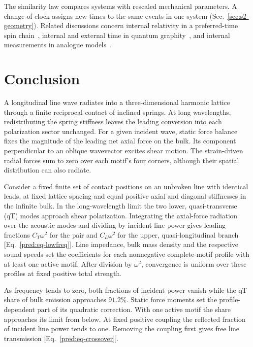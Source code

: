 \documentclass[10pt,aps,onecolumn,floatfix,notitlepage,nofootinbib,showkeys]{revtex4-2}
\begin{document}
The similarity law compares systems with rescaled mechanical parameters. A change of clock assigns new times to the same events in one system (Sec.~\ref{sec:s2-geometry}). Related discussions concern internal relativity in a preferred-time spin chain~\cite{Dreyer2007}, internal and external time in quantum graphity~\cite{Konopka2008}, and internal measurements in analogue models~\cite{Todd2021,BilsonThompson2023}.

\section{Conclusion}
\label{sec:conclusion}

A longitudinal line wave radiates into a three-dimensional harmonic lattice through a finite reciprocal contact of inclined springs. At long wavelengths, redistributing the spring stiffness leaves the leading conversion into each polarization sector unchanged. For a given incident wave, static force balance fixes the magnitude of the leading net axial force on the bulk. Its component perpendicular to an oblique wavevector excites shear motion. The strain-driven radial forces sum to zero over each motif's four corners, although their spatial distribution can also radiate.

Consider a fixed finite set of contact positions on an unbroken line with identical leads, at fixed lattice spacing and equal positive axial and diagonal stiffnesses in the infinite bulk. In the long-wavelength limit the two lower, quasi-transverse (qT) modes approach shear polarization. Integrating the axial-force radiation over the acoustic modes and dividing by incident line power gives leading fractions $C_T\omega^2$ for the pair and $C_L\omega^2$ for the upper, quasi-longitudinal branch [Eq.~\eqref{pred:eq-lowfreq}]. Line impedance, bulk mass density and the respective sound speeds set the coefficients for each nonnegative complete-motif profile with at least one active motif. After division by $\omega^2$, convergence is uniform over these profiles at fixed positive total strength.

As frequency tends to zero, both fractions of incident power vanish while the qT share of bulk emission approaches $91.2\%$. Static force moments set the profile-dependent part of its quadratic correction. With one active motif the share approaches its limit from below. At fixed positive coupling the reflected fraction of incident line power tends to one. Removing the coupling first gives free line transmission [Eq.~\eqref{pred:eq-crossover}].
\end{document}
